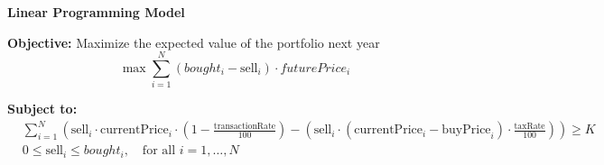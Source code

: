 \documentclass{article}
\begin{document}
\textbf{Linear Programming Model}

\textbf{Objective:} Maximize the expected value of the portfolio next year
\[
\max \sum_{i=1}^{N} (bought_i - \text{sell}_i) \cdot futurePrice_i
\]

\textbf{Subject to:}
\begin{align*}
& \sum_{i=1}^{N} \left( \text{sell}_i \cdot \text{currentPrice}_i \cdot \left(1 - \frac{\text{transactionRate}}{100}\right) - (\text{sell}_i \cdot (\text{currentPrice}_i - \text{buyPrice}_i) \cdot \frac{\text{taxRate}}{100}) \right) \geq K \\
& 0 \leq \text{sell}_i \leq bought_i, \quad \text{for all } i = 1, \ldots, N
\end{align*}
\end{document}
